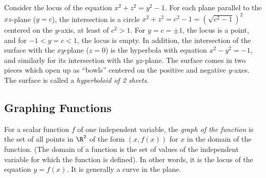 \begin{example}
	Consider the locus of the equation $x^2 + z^2 = y^2 - 1$.  For
	each plane parallel to the $xz$-plane ($y = c$), the intersection
	is a circle $x^2 + z^2 = c^2 - 1 = \left(\sqrt{c^2 - 1}\right)^2$ centered
	on the $y$-axis, at least of $c^2 > 1$.  For $y = c = \pm 1$,
	the locus is a point, and for $-1 < y = c < 1$, the locus is
	empty.   In addition, the intersection of the surface with the
	$xy$-plane ($z = 0$) is the hyperbola with equation $x^2 - y^2
	 = -1$, and similarly for its intersection with the $yz$-plane.
	The surface comes in two pieces which open up as ``bowls'' centered
	on the positive and negative $y$-axes.   The surface is called
	a \emph{hyperboloid of 2 sheets}.    
	
	\begin{center}
	\end{center}
\end{example}

\subsection{Graphing Functions}
For a scalar function $f$ of one independent variable, 
the \emph{graph of the function} is the set of
all points in $\R^2$  of the form  $(x, f(x))$
for $x$ in the domain of the function.   (The domain of a function
is the set of values of the independent variable for which the
function is defined).  In other words, it is the locus of the
equation $y = f(x)$.  It is generally a curve in the plane.

